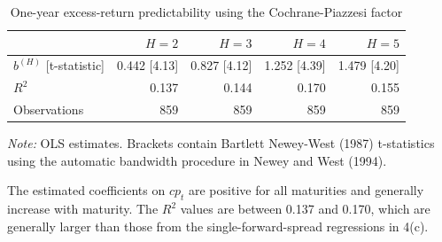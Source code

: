 \documentclass{article}
\begin{document}
\begin{table}[H]
\centering
\caption{One-year excess-return predictability using the Cochrane-Piazzesi factor}
\label{tab:q4e}
\begin{tabular}{lrrrr}
\toprule
 & $H=2$ & $H=3$ & $H=4$ & $H=5$ \\
\midrule
$b^{(H)}$ [t-statistic] & 0.442 [4.13] & 0.827 [4.12] & 1.252 [4.39] & 1.479 [4.20] \\
$R^2$ & 0.137 & 0.144 & 0.170 & 0.155 \\
Observations & 859 & 859 & 859 & 859 \\
\bottomrule
\end{tabular}
\begin{minipage}{0.92\textwidth}
\footnotesize\textit{Note:} OLS estimates. Brackets contain Bartlett Newey-West (1987) t-statistics using the automatic bandwidth procedure in Newey and West (1994).
\end{minipage}
\end{table}

The estimated coefficients on $cp_t$ are positive for all maturities and generally increase with maturity. The $R^2$ values are between 0.137 and 0.170, which are generally larger than those from the single-forward-spread regressions in 4(c). 
\end{document}
